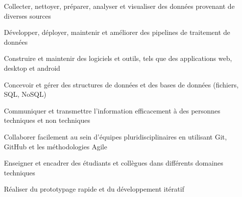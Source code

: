 

\begin{cvskills}

  \begin{minipage}[t]{0.45\textwidth}
    \cvskill
      {Collecter, nettoyer, préparer, analyser et visualiser des données provenant de diverses sources}
  \end{minipage}\hfill
  \begin{minipage}[t]{0.45\textwidth}
    \cvskill
      {Développer, déployer, maintenir et améliorer des pipelines de traitement de données}
  \end{minipage}

  \begin{minipage}[t]{0.45\textwidth}
    \cvskill
      {Construire et maintenir des logiciels et outils, tels que des applications web, desktop et android}
  \end{minipage}\hfill
  \begin{minipage}[t]{0.45\textwidth}
    \cvskill
      {Concevoir et gérer des structures de données et des bases de données (fichiers, SQL, NoSQL)}
  \end{minipage}

  \begin{minipage}[t]{0.45\textwidth}
    \cvskill
      {Communiquer et transmettre l'information efficacement à des personnes techniques et non techniques}
  \end{minipage}\hfill
  \begin{minipage}[t]{0.45\textwidth}
    \cvskill
      {Collaborer facilement au sein d'équipes pluridisciplinaires en utilisant Git, GitHub et les méthodologies Agile}
  \end{minipage}

  \begin{minipage}[t]{0.45\textwidth}
    \cvskill
      {Enseigner et encadrer des étudiants et collègues dans différents domaines techniques}
  \end{minipage}\hfill
  \begin{minipage}[t]{0.45\textwidth}
    \cvskill
      {Réaliser du prototypage rapide et du développement itératif}
  \end{minipage}

\end{cvskills}